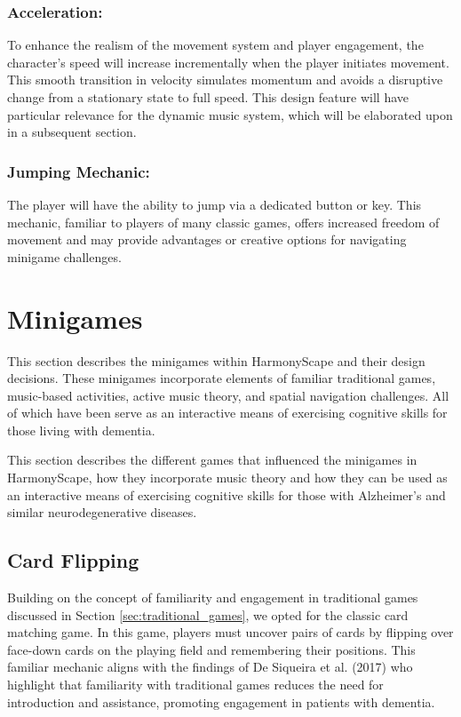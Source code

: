 \documentclass{l4proj}
\begin{document}
\subsubsection{Acceleration:} To enhance the realism of the movement system and player engagement, the character's speed will increase incrementally when the player initiates movement. This smooth transition in velocity simulates momentum and avoids a disruptive change from a stationary state to full speed. This design feature will have particular relevance for the dynamic music system, which will be elaborated upon in a subsequent section.

\subsubsection{Jumping Mechanic:} The player will have the ability to jump via a dedicated button or key. This mechanic, familiar to players of many classic games, offers increased freedom of movement and may provide advantages or creative options for navigating minigame challenges.

\section{Minigames}
This section describes the minigames within HarmonyScape and their design decisions. These minigames incorporate elements of familiar traditional games,  music-based activities, active music theory, and spatial navigation challenges. All of which have been serve as an interactive means of exercising cognitive skills for those living with dementia.

This section describes the different games that influenced the minigames in HarmonyScape, how they incorporate music theory and how they can be used as an interactive means of exercising cognitive skills for those with Alzheimer's and similar neurodegenerative diseases.

\subsection{Card Flipping}
Building on the concept of familiarity and engagement in traditional games discussed in Section \ref{sec:traditional_games}, we opted for the classic card matching game. In this game, players must uncover pairs of cards by flipping over face-down cards on the playing field and remembering their positions. This familiar mechanic aligns with the findings of De Siqueira et al. (2017) who highlight that familiarity with traditional games reduces the need for introduction and assistance, promoting engagement in patients with dementia.
\end{document}

